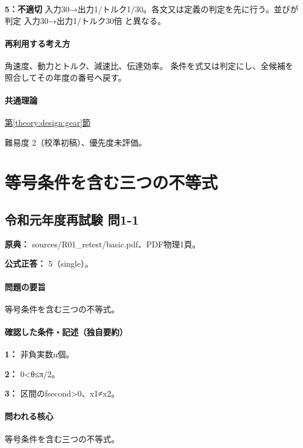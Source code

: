 \noindent\textbf{5：不適切} 入力30→出力1/トルク1/30。各文又は定義の判定を先に行う。並びが判定 入力30→出力1/トルク30倍 と異なる。\par

\paragraph{再利用する考え方} 角速度、動力とトルク、減速比、伝達効率。 条件を式又は判定にし、全候補を照合してその年度の番号へ戻す。

\paragraph{共通理論} \hyperref[theory:design:gear]{第\ref*{theory:design:gear}節}

\par 難易度 2（校準初稿）、優先度未評価。

\section{等号条件を含む三つの不等式}

\subsection{令和元年度再試験 問1-1}
\label{q:r01-ret-basic-1-1}

\noindent\textbf{原典：} sources/R01\_retest/basic.pdf、PDF物理1頁。

\textbf{公式正答：} 5（single）。

\paragraph{問題の要旨} 等号条件を含む三つの不等式。

\paragraph{確認した条件・記述（独自要約）}\mbox{}\par

\noindent\textbf{1：} 非負実数n個。\par

\noindent\textbf{2：} 0<θ≤π/2。\par

\noindent\textbf{3：} 区間のfsecond>0、x1≠x2。\par

\paragraph{問われる核心} 等号条件を含む三つの不等式。

